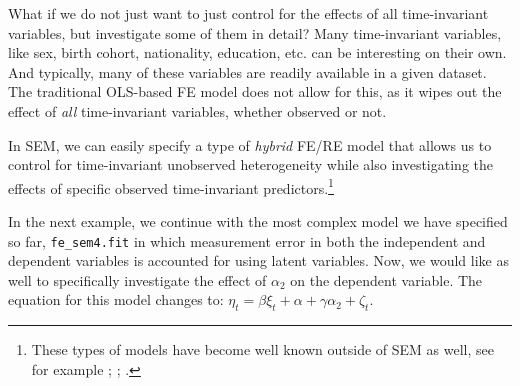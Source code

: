 \documentclass[]{interact}
\theoremstyle{plain}%
\theoremstyle{definition}
\theoremstyle{remark}
\begin{document}
What if we do not just want to just control for the effects of all
time-invariant variables, but investigate some of them in detail? Many
time-invariant variables, like sex, birth cohort, nationality,
education, etc. can be interesting on their own. And typically, many of
these variables are readily available in a given dataset. The
traditional OLS-based FE model does not allow for this, as it wipes out
the effect of \emph{all} time-invariant variables, whether observed or
not.

In SEM, we can easily specify a type of \emph{hybrid} FE/RE model
\citep{Bollen2010} that allows us to control for time-invariant
unobserved heterogeneity while also investigating the effects of
specific observed time-invariant predictors.\footnote{These types of
  models have become well known outside of SEM as well, see for example
  \citet{Allison2011}; \citet{Schunck2013}; \citet{Bell2018}.}

In the next example, we continue with the most complex model we have
specified so far, \texttt{fe\_sem4.fit} in which measurement error in
both the independent and dependent variables is accounted for using
latent variables. Now, we would like as well to specifically investigate
the effect of \(\alpha_{2}\) on the dependent variable. The equation for
this model changes to:
\(\eta_{t} = \beta \xi_{t} + \alpha + \gamma \alpha_{2} + \zeta_{t}\).

\singlespacing
\end{document}
